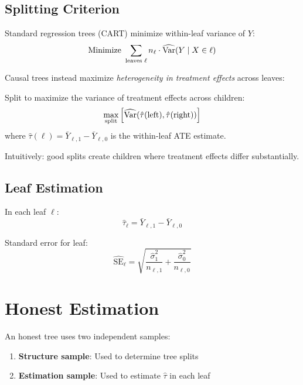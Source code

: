 \subsection{Splitting Criterion}

Standard regression trees (CART) minimize within-leaf variance of $Y$:
\begin{equation}
\text{Minimize } \sum_{\text{leaves } \ell} n_\ell \cdot \widehat{\mathrm{Var}}(Y \mid X \in \ell)
\end{equation}

Causal trees instead maximize \emph{heterogeneity in treatment effects} across leaves:

\begin{definition}
Split to maximize the variance of treatment effects across children:
\begin{equation}
\max_{\text{split}} \left[ \widehat{\mathrm{Var}}(\hat{\tau}(\text{left}), \hat{\tau}(\text{right})) \right]
\end{equation}
where $\hat{\tau}(\ell) = \bar{Y}_{\ell,1} - \bar{Y}_{\ell,0}$ is the within-leaf ATE estimate.
\end{definition}

Intuitively: good splits create children where treatment effects differ substantially.

\subsection{Leaf Estimation}

In each leaf $\ell$:
\begin{equation}
\hat{\tau}_\ell = \bar{Y}_{\ell,1} - \bar{Y}_{\ell,0}
\end{equation}

Standard error for leaf:
\begin{equation}
\widehat{\text{SE}}_\ell = \sqrt{\frac{\hat{\sigma}_1^2}{n_{\ell,1}} + \frac{\hat{\sigma}_0^2}{n_{\ell,0}}}
\end{equation}

\section{Honest Estimation}
\label{sec:honest}

\begin{definition}
\label{def:honest_tree}
An honest tree uses two independent samples:
\begin{enumerate}
    \item \textbf{Structure sample}: Used to determine tree splits
    \item \textbf{Estimation sample}: Used to estimate $\hat{\tau}$ in each leaf
\end{enumerate}
\end{definition}

